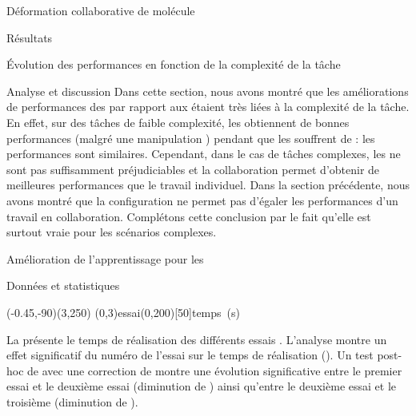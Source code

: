 \documentclass[myfrancais,ngerman,english,french]{mythesis}
\begin{document}
\begin{mychapter}{Déformation collaborative de molécule}
\begin{mysection}{Résultats}
\begin{mysubsection}{Évolution des performances en fonction de la complexité de la tâche}
\begin{mysubsubsection}{Analyse et discussion}
					Dans cette section, nous avons montré que les améliorations de performances des  par rapport aux  étaient très liées à la complexité de la tâche.
					En effet, sur des tâches de faible complexité, les  obtiennent de bonnes performances (malgré une manipulation ) pendant que les  souffrent de  : les performances sont similaires.
					Cependant, dans le cas de tâches complexes, les  ne sont pas suffisamment préjudiciables et la collaboration permet d'obtenir de meilleures performances que le travail individuel.
					Dans la section précédente, nous avons montré que la configuration  ne permet pas d'égaler les performances d'un travail en collaboration.
					Complétons cette conclusion par le fait qu'elle est surtout vraie pour les scénarios complexes.
				\end{mysubsubsection}
			\end{mysubsection}
			\begin{mysubsection}{Amélioration de l'apprentissage pour les }
				\begin{mysubsubsection}{Données et statistiques}
					\begin{myfigure}
						\begin{myps}(-0.45,-90)(3,250)
							\myaxes(0,3){essai}(0,200)[50]{temps~(s)}
						\end{myps}
					\end{myfigure}

					La  présente le temps de réalisation  des différents essais .
					L'analyse montre un effet significatif du numéro de l'essai  sur le temps de réalisation  ().
					Un test post-hoc de  avec une correction de  montre une évolution significative entre le premier essai et le deuxième essai (diminution de ) ainsi qu'entre le deuxième essai et le troisième (diminution de ).


\end{mysubsubsection}
\end{mysubsection}
\end{mysection}
\end{mychapter}
\end{document}
